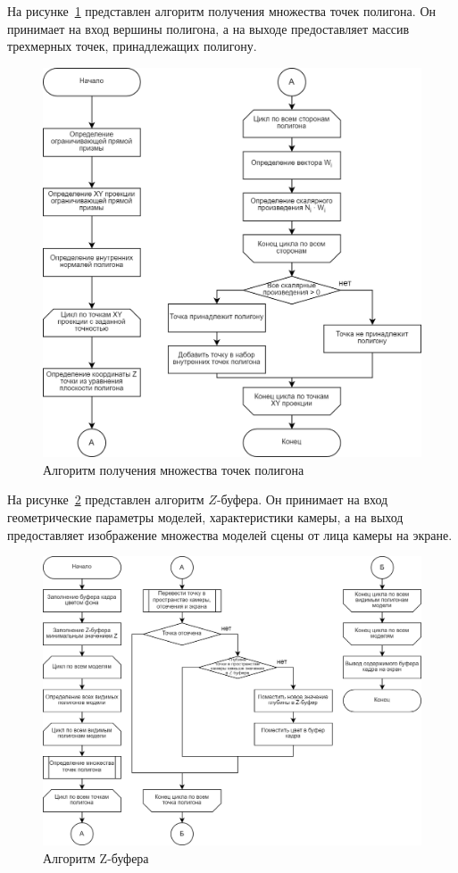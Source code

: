 На рисунке~\ref{fig:set-points} представлен алгоритм получения множества точек полигона. Он принимает на вход вершины полигона, а на выходе предоставляет массив трехмерных точек, принадлежащих полигону.

\begin{figure}[h] 
	\centering
	\includegraphics[width=1\textwidth]{images/points-set.png}
	\caption{Алгоритм получения множества точек полигона} 
	\label{fig:set-points} 
\end{figure}

На рисунке~\ref{fig:z-buffer} представлен алгоритм $Z$-буфера. Он принимает на вход геометрические параметры моделей, характеристики камеры, а на выход предоставляет изображение множества моделей сцены от лица камеры на экране.

\begin{figure}[h] 
	\centering
	\includegraphics[width=1\textwidth]{images/z-buffer.png}
	\caption{Алгоритм Z-буфера} 
	\label{fig:z-buffer} 
\end{figure}

